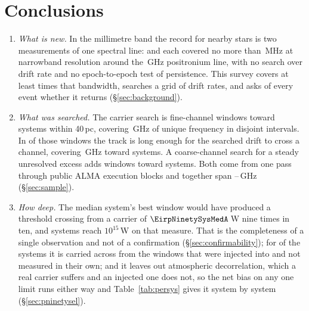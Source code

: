 \section{Conclusions}
\label{sec:conclusions}

\begin{enumerate}[leftmargin=1.6em,itemsep=4pt,topsep=4pt,parsep=0pt]

\item \emph{What is new.} In the millimetre band the record for nearby stars
is two measurements of one spectral line: \citet{Steffes1994} and
\citet{Mauersberger1996} each covered no more than \SbPriorBandMHz\,MHz at
narrowband resolution around the \SbPriorFreqGHz\,GHz positronium line, with
no search over drift rate and
no epoch-to-epoch test of persistence. This survey covers at
least \SbPriorRatio{} times that bandwidth, searches a grid of drift rates,
and asks of every event whether it returns (\S\ref{sec:background}).

\item \emph{What was searched.} The carrier search is \NWinA{} fine-channel
windows toward \NSysClassA{} systems within 40\,pc, covering \CvUnionA\,GHz
of unique frequency in \CovNIslands{} disjoint intervals. In \EdrNWinA{} of
those windows the track is long enough for the searched drift to cross a
channel, covering \EdrUnionGHz\,GHz toward \EdrNSys{} systems. A coarse-channel
search for a steady unresolved excess adds \NWinB{} windows toward
\PrSysClassB{} systems. Both come from one pass through \NEB{} public ALMA
execution blocks and together span \SurvFreqLo--\SurvFreqHi\,GHz
(\S\ref{sec:sample}).

\item \emph{How deep.} The median system's best window would have produced a
threshold crossing from a carrier of $\EirpNinetySysMedA$\,W nine times in
ten, and \NSysEfifteen{} systems reach $10^{15}$\,W on that measure. That is
the completeness of a single observation and not of a confirmation
(\S\ref{sec:confirmability}); for \SmcNEstSys{} of the \NSysClassA{} systems
it is carried across from the windows that were injected into and not
measured in their own; and it leaves out atmospheric decorrelation, which a
real carrier suffers and an injected one does not, so the net bias on any one
limit runs either way and Table~\ref{tab:persys} gives it system by system
(\S\ref{sec:pninetysel}).


\end{enumerate}
